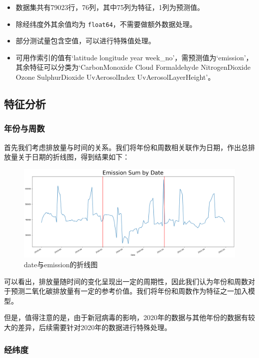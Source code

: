 \documentclass{ctexart}
\begin{document}
\begin{itemize}
      \item 数据集共有79023行，76列，其中75列为特征，1列为预测值。
      \item 除经纬度外其余值均为 \texttt{float64}，不需要做额外数据处理。
      \item 部分测试量包含空值，可以进行特殊值处理。
      \item 可用作索引的值有`latitude longitude year week\_no'，需预测值为`emission'，其余特征可以分类为`CarbonMonoxide Cloud Formaldehyde NitrogenDioxide Ozone SulphurDioxide UvAerosolIndex UvAerosolLayerHeight'。
\end{itemize}

\subsection{特征分析}

\subsubsection{年份与周数}

首先我们考虑排放量与时间的关系。我们将年份和周数相关联作为日期，作出总排放量关于日期的折线图，得到结果如下：

\begin{figure}[H]
      \centering
      \includegraphics[width=1\textwidth]{output2.png}
      \caption{date与emission的折线图}
\end{figure}

可以看出，排放量随时间的变化呈现出一定的周期性，因此我们认为年份和周数对于预测二氧化碳排放量有一定的参考价值。我们将年份和周数作为特征之一加入模型。

但是，值得注意的是，由于新冠病毒的影响，2020年的数据与其他年份的数据有较大的差异，后续需要针对2020年的数据进行特殊处理。

\subsubsection{经纬度}
\end{document}
